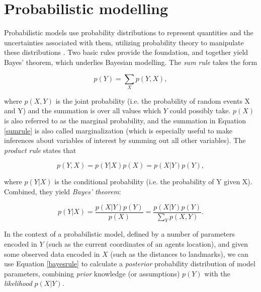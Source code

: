 

\section{Probabilistic modelling}

Probabilistic models use probability distributions to represent quantities and the uncertainties associated with them, utilizing probability theory to manipulate these distributions \citep{ghahramani2015probabilistic}. Two basic rules provide the foundation, and together yield Bayes' theorem, which underlies Bayesian modelling. The \textit{sum rule} takes the form

\begin{equation}
\label{sumrule}
p(Y) = \sum_{X} p(Y, X),
\end{equation}

where $p(X,Y)$ is the joint probability (i.e. the probability of random events X and Y) and the summation is over all values which $Y$ could possibly take. $p(X)$ is also referred to as the marginal probability, and the summation in Equation \ref{sumrule} is also called marginalization (which is especially useful to make inferences about variables of interest by summing out all other variables). The \textit{product rule} states that

\begin{equation}
\label{productrule}
p(Y,X) = p(Y|X)p(X) = p(X|Y)p(Y),
\end{equation}

\noindent where $p(Y|X)$ is the conditional probability (i.e. the probability of Y given X). Combined, they yield \textit{Bayes' theorem}:

\begin{equation}
\label{bayesrule}
p(Y|X) = \frac{p(X|Y)p(Y)}{p(X)} = \frac{p(X|Y)p(Y)}{\sum_{Y} p(X, Y)}.
\end{equation}

In the context of a probabilistic model, defined by a number of parameters encoded in $Y$ (such as the current coordinates of an agents location), and given some observed data encoded in $X$ (such as the distances to landmarks), we can use Equation \ref{bayesrule} to calculate a \textit{posterior} probability distribution of model parameters, combining \textit{prior} knowledge (or assumptions) $p(Y)$ with the \textit{likelihood} $p(X|Y)$.

